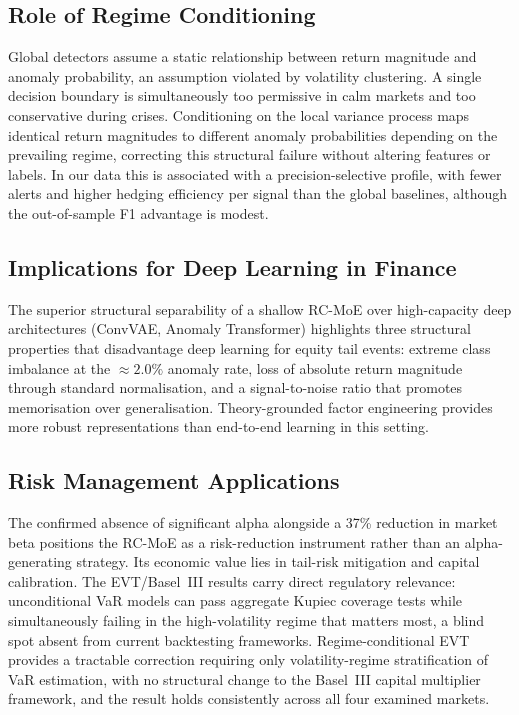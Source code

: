 \documentclass[]{interact}
\begin{document}
\subsection{Role of Regime Conditioning}
\label{subsec:disc_regime}
Global detectors assume a static relationship between return magnitude and anomaly probability, an assumption violated by volatility clustering. A single decision boundary is simultaneously too permissive in calm markets and too conservative during crises. Conditioning on the local variance process maps identical return magnitudes to different anomaly probabilities depending on the prevailing regime, correcting this structural failure without altering features or labels. In our data this is associated with a precision-selective profile, with fewer alerts and higher hedging efficiency per signal than the global baselines, although the out-of-sample F1 advantage is modest.

\subsection{Implications for Deep Learning in Finance}
\label{subsec:disc_deeplearning}
The superior structural separability of a shallow RC-MoE over high-capacity deep architectures (ConvVAE, Anomaly Transformer) highlights three structural properties that disadvantage deep learning for equity tail events: extreme class imbalance at the ${\approx}2.0\%$ anomaly rate, loss of absolute return magnitude through standard normalisation, and a signal-to-noise ratio that promotes memorisation over generalisation. Theory-grounded factor engineering provides more robust representations than end-to-end learning in this setting.

\subsection{Risk Management Applications}
\label{subsec:disc_risk}
The confirmed absence of significant alpha alongside a 37\% reduction in market beta positions the RC-MoE as a risk-reduction instrument rather than an alpha-generating strategy. Its economic value lies in tail-risk mitigation and capital calibration. The EVT/Basel~III results carry direct regulatory relevance: unconditional VaR models can pass aggregate Kupiec coverage tests while simultaneously failing in the high-volatility regime that matters most, a blind spot absent from current backtesting frameworks. Regime-conditional EVT provides a tractable correction requiring only volatility-regime stratification of VaR estimation, with no structural change to the Basel~III capital multiplier framework, and the result holds consistently across all four examined markets.
\end{document}
